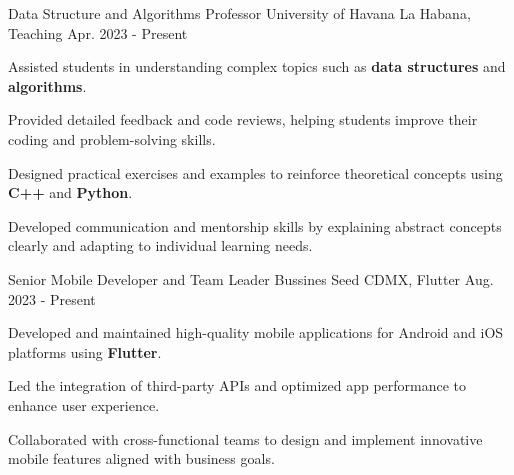 \begin{cventries}
  \cventry
    {Data Structure and Algorithms Professor}
    {University of Havana}
    {La Habana, Teaching}
    {Apr. 2023 - Present}
    {
      \begin{cvitems}
        \item {Assisted students in understanding complex topics such as \textbf{data structures} and \textbf{algorithms}.}
        \item {Provided detailed feedback and code reviews, helping students improve their coding and problem-solving skills.}
        \item {Designed practical exercises and examples to reinforce theoretical concepts using \textbf{C++} and \textbf{Python}.}
        \item {Developed communication and mentorship skills by explaining abstract concepts clearly and adapting to individual learning needs.}
      \end{cvitems}
}
  \cventry
    {Senior Mobile Developer and Team Leader}
    {Bussines Seed}
    {CDMX, Flutter}
    {Aug. 2023 - Present}
    {
       \begin{cvitems}
        \item {Developed and maintained high-quality mobile applications for Android and iOS platforms using \textbf{Flutter}.}
        \item {Led the integration of third-party APIs and optimized app performance to enhance user experience.}
        \item {Collaborated with cross-functional teams to design and implement innovative mobile features aligned with business goals.}
      \end{cvitems}
    }
  \end{cventries}
